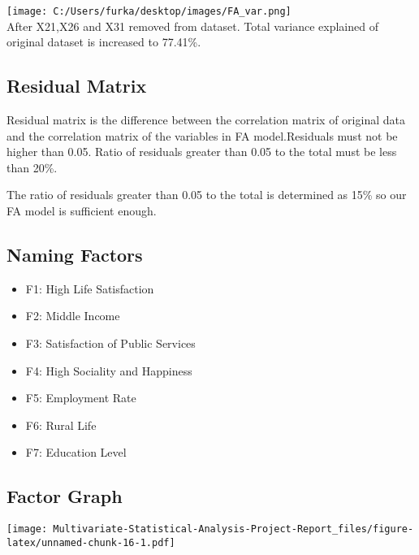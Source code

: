 \documentclass[12pt,twoside]{deuthesis}
\newenvironment{Shaded}{\begin{snugshade}}{\end{snugshade}}
\newcommand{\AttributeTok}[1]{\textcolor[rgb]{0.77,0.63,0.00}{#1}}
\newcommand{\DecValTok}[1]{\textcolor[rgb]{0.00,0.00,0.81}{#1}}
\newcommand{\FloatTok}[1]{\textcolor[rgb]{0.00,0.00,0.81}{#1}}
\newcommand{\FunctionTok}[1]{\textcolor[rgb]{0.00,0.00,0.00}{#1}}
\newcommand{\NormalTok}[1]{#1}
\newcommand{\SpecialCharTok}[1]{\textcolor[rgb]{0.00,0.00,0.00}{#1}}
\newcommand{\StringTok}[1]{\textcolor[rgb]{0.31,0.60,0.02}{#1}}
\providecommand{\tightlist}{%
  \setlength{\itemsep}{0pt}\setlength{\parskip}{0pt}}
\begin{document}
\texttt{[image: C:/Users/furka/desktop/images/FA\_var.png]}\\
\setlength{\parindent}{0in}
After X21,X26 and X31 removed from dataset. Total variance explained of original dataset is increased to 77.41\%.

\hypertarget{residual-matrix}{%
\subsection{Residual Matrix}\label{residual-matrix}}

Residual matrix is the difference between the correlation matrix of original data and the correlation matrix of the variables in FA model.Residuals must not be higher than 0.05.
Ratio of residuals greater than 0.05 to the total must be less than 20\%.\\

\setlength{\parskip}{0in}

The ratio of residuals greater than 0.05 to the total is determined as 15\% so our FA model is sufficient enough.

\hypertarget{naming-factors}{%
\subsection{Naming Factors}\label{naming-factors}}
\begin{itemize}
\tightlist
\item
  F1: High Life Satisfaction
\item
  F2: Middle Income
\item
  F3: Satisfaction of Public Services
\item
  F4: High Sociality and Happiness
\item
  F5: Employment Rate
\item
  F6: Rural Life
\item
  F7: Education Level
\end{itemize}
\hypertarget{factor-graph}{%
\subsection{Factor Graph}\label{factor-graph}}
\begin{Shaded}
\end{Shaded}
\texttt{[image: Multivariate-Statistical-Analysis-Project-Report\_files/figure-latex/unnamed-chunk-16-1.pdf]}
\end{document}
